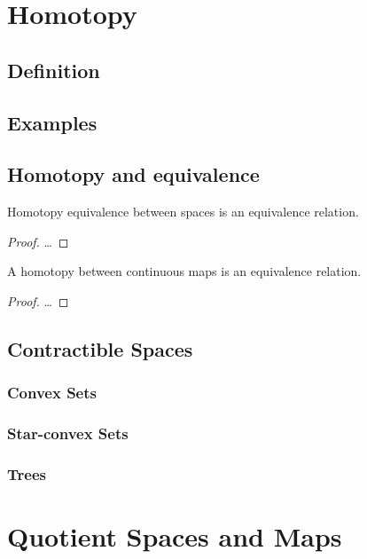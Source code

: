 \documentclass[10pt]{article}
\begin{document}
\section{Homotopy}

\subsection{Definition}
\subsection{Examples}
\subsection{Homotopy and equivalence}

\begin{theorem}
  Homotopy equivalence between spaces is an equivalence relation.
\end{theorem}

\begin{proof}
  \ldots
\end{proof}

\begin{theorem}
  A homotopy between continuous maps is an equivalence relation.
\end{theorem}

\begin{proof}
  \ldots
\end{proof}

\subsection{Contractible Spaces}

\subsubsection{Convex Sets}

\subsubsection{Star-convex Sets}

\subsubsection{Trees}

\section{Quotient Spaces and Maps}
\end{document}
